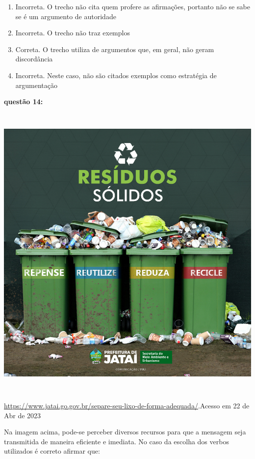 {\begin{enumerate}
\def\labelenumi{\arabic{enumi}.}
\item
  Incorreta. O trecho não cita quem profere as afirmações, portanto não
  se sabe se é um argumento de autoridade
\item
  Incorreta. O trecho não traz exemplos
\item
  Correta. O trecho utiliza de argumentos que, em geral, não geram
  discordância
\item
  Incorreta. Neste caso, não são citados exemplos como estratégia de
  argumentação
\end{enumerate}

\textbf{questão 14:}

\includegraphics[width=5.90551in,height=5.90278in]{./imgSAEB_7_POR/media/image19.png}

\href{https://www.jatai.go.gov.br/separe-seu-lixo-de-forma-adequada/}{\uline{https://www.jatai.go.gov.br/separe-seu-lixo-de-forma-adequada/}}.Acesso
em 22 de Abr de 2023

Na imagem acima, pode-se perceber diversos recursos para que a mensagem
seja transmitida de maneira eficiente e imediata. No caso da escolha dos
verbos utilizados é correto afirmar que:

}
